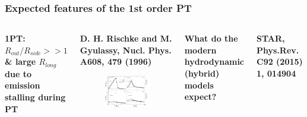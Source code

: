 \documentclass[dvipsnames] {beamer}
\begin{document}
\begin{frame}
  \frametitle{Expected features of the 1st order PT}
  \begin{columns}[c]
    \begin{block}{}
     {\footnotesize \bf 1PT: $R_{out} / R_{side} >> 1$ \& large $R_{long}$ due to emission stalling during PT}
    \end{block}
    \begin{block}{\center \footnotesize \bf D. H. Rischke and M. Gyulassy,  Nucl. Phys. A608, 479 (1996)}
      \begin{figure}[H]
        \includegraphics[width=0.75\linewidth]{corr_femto6.png}
      \end{figure}
    \end{block}
    \begin{block}{}
      {\centering \footnotesize \bf \alert {What do the modern  hydrodynamic (hybrid) models expect?}}
    \end{block}
    \begin{block}{\center \tiny \bf STAR, Phys.Rev. C92 (2015) 1, 014904}
      \begin{figure}[H]

\end{figure}
\end{block}
\end{columns}
\end{frame}
\end{document}
